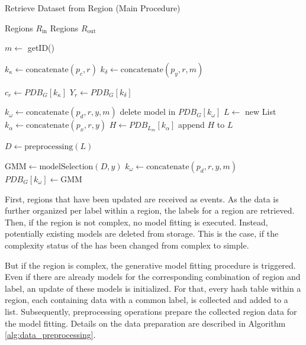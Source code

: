 \begin{algorithm}
    \caption{Retrieve Dataset from Region (Main Procedure)}
    \label{alg:generative_fitting}
 
    \begin{algorithmic}[1]
        \REQUIRE Regions $R_{\text{in}}$
        \ENSURE Regions $R_{\text{out}}$

        \STATE $m \leftarrow$ getID()

            \STATE $k_\kappa \leftarrow \text{concatenate}(p_c, r)$
            \STATE $k_\delta \leftarrow \text{concatenate}(p_y, r, m)$

            \STATE $c_r \leftarrow PDB_G[k_\kappa]$
            \STATE $Y_r \leftarrow PDB_G[k_\delta]$ %

                    \STATE $k_\omega \leftarrow \text{concatenate}(p_d, r, y, m)$ 
                    \STATE delete model in $PDB_G[k_\omega]$
                \ENDFOR
            \ELSE
                \STATE $L \leftarrow$ new List
                    \STATE $k_\alpha \leftarrow \text{concatenate}(p_x, r, y)$
                    \STATE $H \leftarrow PDB_{L_m}[k_\alpha]$
                    \STATE append $H$ to $L$
                \ENDFOR

                \STATE $D \leftarrow \text{preprocessing}(L)$

                    \STATE $\text{GMM} \leftarrow \text{modelSelection}(D, y)$
                    \STATE $k_\omega \leftarrow \text{concatenate}(p_d, r, y, m)$ 
                    \STATE $PDB_G[k_\omega] \leftarrow \text{GMM}$
                \ENDFOR
            \ENDIF
            


        \ENDFOR
    \end{algorithmic}
 \end{algorithm}

 First, regions that have been updated are received as events. As the data is further organized per label within a region, the labels for a region are retrieved. Then, if the region is not complex, no model fitting is executed. Instead, potentially existing models are deleted from storage. This is the case, if the complexity status of the has been changed from complex to simple.

 But if the region is complex, the generative model fitting procedure is triggered. Even if there are already models for the corresponding combination of region and label, an update of these models is initialized. For that, every hash table within a region, each containing data with a common label, is collected and added to a list. Subsequently, preprocessing operations prepare the collected region data for the model fitting. Details on the data preparation are described in Algorithm \ref{alg:data_preprocessing}.

